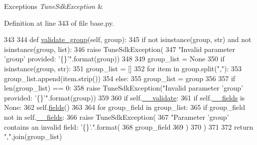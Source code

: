 \begin{DoxyExceptions}{Exceptions}
{\em Tune\-Sdk\-Exception} & \\
\hline
\end{DoxyExceptions}


Definition at line 343 of file base.\-py.


\begin{DoxyCode}
343 
344     \textcolor{keyword}{def }\hyperlink{classtune_1_1management_1_1endpoints_1_1base_1_1TuneManagementBase_ae60c7ea424b0242e7d54d5b488d85f91}{validate\_group}(self, group):
345         \textcolor{keywordflow}{if} \textcolor{keywordflow}{not} isinstance(group, str) \textcolor{keywordflow}{and} \textcolor{keywordflow}{not} isinstance(group, list):
346             \textcolor{keywordflow}{raise} TuneSdkException(
347                 \textcolor{stringliteral}{"Invalid parameter 'group' provided: '\{\}'"}.format(group))
348 
349         group\_list = \textcolor{keywordtype}{None}
350         \textcolor{keywordflow}{if} isinstance(group, str):
351             group\_list = []
352             \textcolor{keywordflow}{for} item \textcolor{keywordflow}{in} group.split(\textcolor{stringliteral}{","}):
353                 group\_list.append(item.strip())
354         \textcolor{keywordflow}{else}:
355             group\_list = group
356 
357         \textcolor{keywordflow}{if} len(group\_list) == 0:
358             \textcolor{keywordflow}{raise} TuneSdkException(\textcolor{stringliteral}{"Invalid parameter 'group' provided: '\{\}'"}.format(group))
359 
360         \textcolor{keywordflow}{if} self.\hyperlink{classtune_1_1management_1_1endpoints_1_1base_1_1TuneManagementBase_a1cbfd5de3682af94b39f02abfd89e1dc}{\_\_validate}:
361             \textcolor{keywordflow}{if} self.\hyperlink{classtune_1_1management_1_1endpoints_1_1base_1_1TuneManagementBase_ac4a85901e26423540bf102209827a737}{\_\_fields} \textcolor{keywordflow}{is} \textcolor{keywordtype}{None}:
362                 self.\hyperlink{classtune_1_1management_1_1endpoints_1_1base_1_1TuneManagementBase_abf3e64564de650a15b23f5be8b9d8058}{fields}()
363 
364             \textcolor{keywordflow}{for} group\_field \textcolor{keywordflow}{in} group\_list:
365                 \textcolor{keywordflow}{if} group\_field \textcolor{keywordflow}{not} \textcolor{keywordflow}{in} self.\hyperlink{classtune_1_1management_1_1endpoints_1_1base_1_1TuneManagementBase_ac4a85901e26423540bf102209827a737}{\_\_fields}:
366                     \textcolor{keywordflow}{raise} TuneSdkException(
367                         \textcolor{stringliteral}{"Parameter 'group' contains an invalid field: '\{\}'."}.format(
368                             group\_field
369                             )
370                         )
371 
372         \textcolor{keywordflow}{return} \textcolor{stringliteral}{","}.join(group\_list)

\end{DoxyCode}



